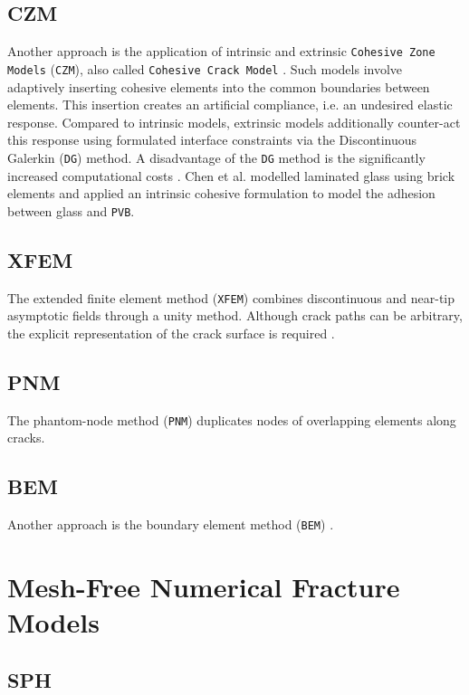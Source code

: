 \documentclass[format=acmsmall, 12pt, screen=true, review=false]{acmart}
\begin{document}
\subsection{CZM}

Another approach is the application of intrinsic and extrinsic \texttt{Cohesive Zone Models} (\texttt{CZM}), also called \texttt{Cohesive Crack Model} \cite{Gao14}. Such models involve adaptively inserting cohesive elements into the common boundaries between elements. This insertion creates an artificial compliance, i.e. an undesired elastic response. Compared to intrinsic models, extrinsic models additionally counter-act this response using formulated interface constraints via the Discontinuous Galerkin (\texttt{DG}) method. A disadvantage of the \texttt{DG} method is the significantly increased computational costs \cite{Wan18, Liu16, Che16}. Chen et al. \cite{Che16} modelled laminated glass using brick elements and applied an intrinsic cohesive formulation to model the adhesion between glass and \texttt{PVB}. 

\subsection{XFEM}

The extended finite element method (\texttt{XFEM}) \cite{Alt17, Xu10, Xu16} combines discontinuous and near-tip asymptotic fields through a unity method. \cite{Mun13} Although crack paths can be arbitrary, the explicit representation of the crack surface is required \cite{Rab04}.

\subsection{PNM}

The phantom-node method (\texttt{PNM}) duplicates nodes of overlapping elements along cracks.

\subsection{BEM}

Another approach is the boundary element method (\texttt{BEM}) \cite{Mun13}.
\section{Mesh-Free Numerical Fracture Models}

\subsection{SPH}
\end{document}
